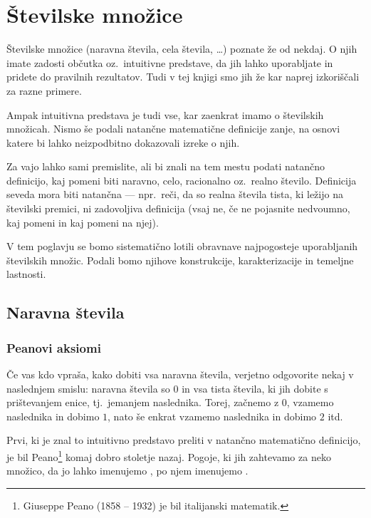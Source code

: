 \chapter{Številske množice}

Številske množice (naravna števila, cela števila, \ldots) poznate že od nekdaj. O njih imate zadosti občutka oz.~intuitivne predstave, da jih lahko uporabljate in pridete do pravilnih rezultatov. Tudi v tej knjigi smo jih že kar naprej izkoriščali za razne primere.

Ampak intuitivna predstava je tudi vse, kar zaenkrat imamo o številskih množicah. Nismo še podali natančne matematične definicije zanje, na osnovi katere bi lahko neizpodbitno dokazovali izreke o njih.

Za vajo lahko sami premislite, ali bi znali na tem mestu podati natančno definicijo, kaj pomeni biti naravno, celo, racionalno oz.~realno število. Definicija seveda mora biti natančna --- npr.~reči, da so realna števila tista, ki ležijo na številski premici, ni zadovoljiva definicija (vsaj ne, če ne pojasnite nedvoumno, kaj pomeni  in kaj pomeni  na njej).

V tem poglavju se bomo sistematično lotili obravnave najpogosteje uporabljanih številskih množic. Podali bomo njihove konstrukcije, karakterizacije in temeljne lastnosti.


\section{Naravna števila}

\subsection{Peanovi aksiomi}

Če vas kdo vpraša, kako dobiti vsa naravna števila, verjetno odgovorite nekaj v naslednjem smislu: naravna števila so $0$ in vsa tista števila, ki jih dobite s prištevanjem enice, tj.~jemanjem naslednika. Torej, začnemo z $0$, vzamemo naslednika in dobimo $1$, nato še enkrat vzamemo naslednika in dobimo $2$ itd.

Prvi, ki je znal to intuitivno predstavo preliti v natančno matematično definicijo, je bil Peano\footnote{Giuseppe Peano (1858 -- 1932) je bil italijanski matematik.} komaj dobro stoletje nazaj. Pogoje, ki jih zahtevamo za neko množico, da jo lahko imenujemo , po njem imenujemo . 

